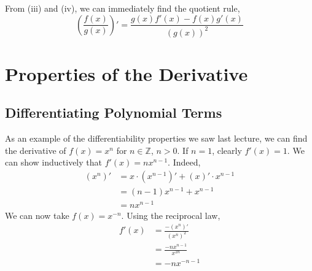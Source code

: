 \documentclass{article}
\begin{document}
\begin{remark}
    From (iii) and (iv), we can immediately find the quotient rule,
    \[ \left( \frac{f(x)}{g(x)} \right)' = \frac{g(x)f'(x) - f(x)g'(x)}{(g(x))^2} \]
\end{remark}

\section{Properties of the Derivative}
\subsection{Differentiating Polynomial Terms}
As an example of the differentiability properties we saw last lecture, we can find the derivative of $f(x) = x^n$ for $n \in \mathbb Z$, $n > 0$. If $n=1$, clearly $f'(x) = 1$. We can show inductively that $f'(x) = nx^{n-1}$. Indeed,
\begin{align*}
    (x^n)' & = x \cdot (x^{n-1})' + (x)' \cdot x^{n-1} \\
           & = (n-1)x^{n-1} + x^{n-1}                  \\
           & = nx^{n-1}
\end{align*}
We can now take $f(x) = x^{-n}$. Using the reciprocal law,
\begin{align*}
    f'(x) & = \frac{-(x^n)'}{(x^n)^2}  \\
          & = \frac{-nx^{n-1}}{x^{2n}} \\
          & = -nx^{-n-1}
\end{align*}
\end{document}
